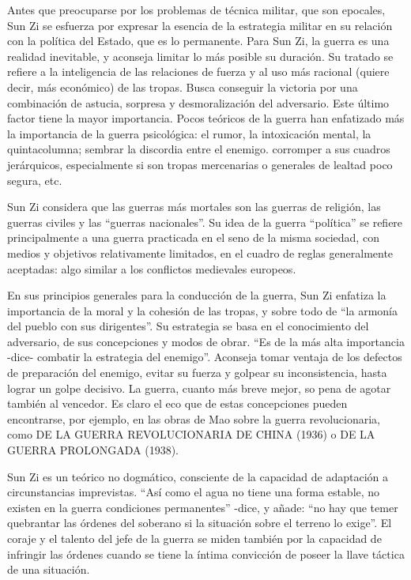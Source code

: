 \documentclass[
]{book}
\begin{document}
Antes que preocuparse por los problemas de técnica militar, que son epocales, Sun Zi se esfuerza por expresar la esencia de la estrategia militar en su relación con la política del Estado, que es lo permanente. Para Sun Zi, la guerra es una realidad inevitable, y aconseja limitar lo más posible su duración. Su tratado se refiere a la inteligencia de las relaciones de fuerza y al uso más racional (quiere decir, más económico) de las tropas. Busca conseguir la victoria por una combinación de astucia, sorpresa y desmoralización del adversario. Este último factor tiene la mayor importancia. Pocos teóricos de la guerra han enfatizado más la importancia de la guerra psicológica: el rumor, la intoxicación mental, la quintacolumna; sembrar la discordia entre el enemigo. corromper a sus cuadros jerárquicos, especialmente si son tropas mercenarias o generales de lealtad poco segura, etc.

Sun Zi considera que las guerras más mortales son las guerras de religión, las guerras civiles y las ``guerras nacionales''. Su idea de la guerra ``política'' se refiere principalmente a una guerra practicada en el seno de la misma sociedad, con medios y objetivos relativamente limitados, en el cuadro de reglas generalmente aceptadas: algo similar a los conflictos medievales europeos.

En sus principios generales para la conducción de la guerra, Sun Zi enfatiza la importancia de la moral y la cohesión de las tropas, y sobre todo de ``la armonía del pueblo con sus dirigentes''. Su estrategia se basa en el conocimiento del adversario, de sus concepciones y modos de obrar. ``Es de la más alta importancia -dice- combatir la estrategia del enemigo''. Aconseja tomar ventaja de los defectos de preparación del enemigo, evitar su fuerza y golpear su inconsistencia, hasta lograr un golpe decisivo. La guerra, cuanto más breve mejor, so pena de agotar también al vencedor. Es claro el eco que de estas concepciones pueden encontrarse, por ejemplo, en las obras de Mao sobre la guerra revolucionaria, como DE LA GUERRA REVOLUCIONARIA DE CHINA (1936) o DE LA GUERRA PROLONGADA (1938).

Sun Zi es un teórico no dogmático, consciente de la capacidad de adaptación a circunstancias imprevistas. ``Así como el agua no tiene una forma estable, no existen en la guerra condiciones permanentes'' -dice, y añade: ``no hay que temer quebrantar las órdenes del soberano si la situación sobre el terreno lo exige''. El coraje y el talento del jefe de la guerra se miden también por la capacidad de infringir las órdenes cuando se tiene la íntima convicción de poseer la llave táctica de una situación.
\end{document}
